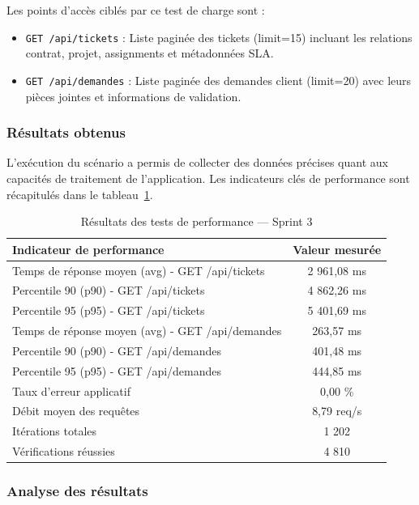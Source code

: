 Les points d'accès ciblés par ce test de charge sont :
\begin{itemize}
    \item \texttt{GET /api/tickets} : Liste paginée des tickets (limit=15) incluant
          les relations contrat, projet, assignments et métadonnées SLA.
    \item \texttt{GET /api/demandes} : Liste paginée des demandes client (limit=20)
          avec leurs pièces jointes et informations de validation.
\end{itemize}

\subsubsection{Résultats obtenus}

L'exécution du scénario a permis de collecter des données précises quant
aux capacités de traitement de l'application. Les indicateurs clés de
performance sont récapitulés dans le tableau~\ref{tab:perf_sprint3}.

\begin{table}[H]
\centering
\renewcommand{\arraystretch}{1.3}
\small
\begin{tabular}{|l|c|}
\hline
\textbf{Indicateur de performance} & \textbf{Valeur mesurée} \\
\hline
Temps de réponse moyen (avg) - GET /api/tickets & 2 961,08 ms \\
\hline
Percentile 90 (p90) - GET /api/tickets & 4 862,26 ms \\
\hline
Percentile 95 (p95) - GET /api/tickets & 5 401,69 ms \\
\hline
Temps de réponse moyen (avg) - GET /api/demandes & 263,57 ms \\
\hline
Percentile 90 (p90) - GET /api/demandes & 401,48 ms \\
\hline
Percentile 95 (p95) - GET /api/demandes & 444,85 ms \\
\hline
Taux d'erreur applicatif & 0,00 \% \\
\hline
Débit moyen des requêtes & 8,79 req/s \\
\hline
Itérations totales & 1 202 \\
\hline
Vérifications réussies & 4 810 \\
\hline
\end{tabular}
\caption{Résultats des tests de performance — Sprint 3}
\label{tab:perf_sprint3}
\end{table}

\subsubsection{Analyse des résultats}

